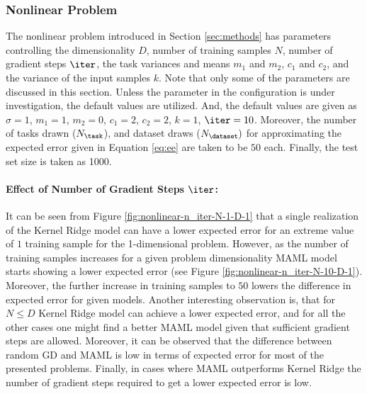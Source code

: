 \subsubsection{Nonlinear Problem}

The nonlinear problem introduced in Section \ref{sec:methods} has parameters controlling the dimensionality $D$, number of training samples $N$, number of gradient steps $\iter$, the task variances and means $m_1$ and $m_2$, $c_1$ and $c_2$, and the variance of the input samples $k$. Note that only some of the parameters are discussed in this section. Unless the parameter in the configuration is under investigation, the default values are utilized. And, the default values are given as $\sigma=1$, $m_1=1$, $m_2=0$, $c_1=2$, $c_2=2$, $k=1$, $\iter=10$. Moreover, the number of tasks drawn ($N_{\task}$), and dataset draws ($N_{\dataset})$  for approximating the expected error given in Equation \ref{eq:ee} are taken to be $50$ each. Finally, the test set size is taken as 1000.

\paragraph{Effect of Number of Gradient Steps $\iter$:} It can be seen from Figure \ref{fig:nonlinear-n_iter-N-1-D-1} that a single realization of the Kernel Ridge model can have a lower expected error for an extreme value of $1$ training sample for the 1-dimensional problem. However, as the number of training samples increases for a given problem dimensionality MAML model starts showing a lower expected error (see Figure \ref{fig:nonlinear-n_iter-N-10-D-1}). Moreover, the further increase in training samples to $50$ lowers the difference in expected error for given models. Another interesting observation is, that for $N\leq D$ Kernel Ridge model can achieve a lower expected error, and for all the other cases one might find a better MAML model given that sufficient gradient steps are allowed. Moreover, it can be observed that the difference between random GD and MAML is low in terms of expected error for most of the presented problems. Finally, in cases where MAML outperforms Kernel Ridge the number of gradient steps required to get a lower expected error is low.


